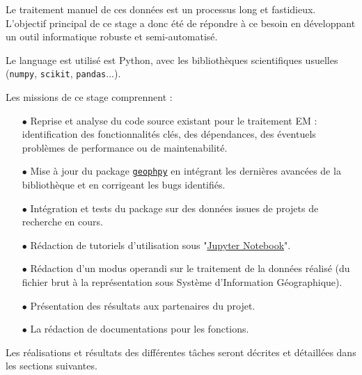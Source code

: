 \documentclass[12pt]{article}
\begin{document}
    Le traitement manuel de ces données est un processus long et fastidieux. L'objectif principal de ce stage a donc été de répondre à ce besoin en développant un outil informatique robuste et semi-automatisé.

    Le language est utilisé est Python, avec les bibliothèques scientifiques usuelles (\texttt{numpy}, \texttt{scikit}, \texttt{pandas}...).

    Les missions de ce stage comprennent :

    \begin{enumerate}
        \item[$\bullet$] Reprise et analyse du code source existant pour le traitement EM : identification des fonctionnalités clés, des dépendances, des éventuels problèmes de performance ou de maintenabilité.
        \item[$\bullet$] Mise à jour du package \href{https://pypi.org/project/GeophPy/}{\texttt{geophpy}} en intégrant les dernières avancées de la bibliothèque et en corrigeant les bugs identifiés.
        \item[$\bullet$] Intégration et tests du package sur des données issues de projets de recherche en cours.
        \item[$\bullet$] Rédaction de tutoriels d’utilisation sous "\href{https://jupyter.org/}{Jupyter Notebook}".
        \item[$\bullet$] Rédaction d’un modus operandi sur le traitement de la données réalisé (du fichier brut à la représentation sous Système d'Information Géographique).
        \item[$\bullet$] Présentation des résultats aux partenaires du projet.
        \item[$\bullet$] La rédaction de documentations pour les fonctions.
    \end{enumerate}

    Les réalisations et résultats des différentes tâches seront décrites et détaillées dans les sections suivantes.
\end{document}
